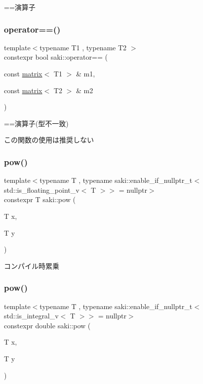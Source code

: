 ==演算子 

\mbox{\label{namespacesaki_a1ffbf8122dda5209dc384e64747bec32}} 
\subsubsection{\texorpdfstring{operator==()}{operator==()}\hspace{0.1cm}{\footnotesize\ttfamily [11/11]}}
{\footnotesize\ttfamily template$<$typename T1 , typename T2 $>$ \\
constexpr bool saki\+::operator== (\begin{DoxyParamCaption}\item[{const \mbox{\hyperlink{classsaki_1_1matrix}{matrix}}$<$ T1 $>$ \&}]{m1,  }\item[{const \mbox{\hyperlink{classsaki_1_1matrix}{matrix}}$<$ T2 $>$ \&}]{m2 }\end{DoxyParamCaption})}



==演算子(型不一致) 

この関数の使用は推奨しない \mbox{\label{namespacesaki_aa5b66f18d7c8c94b4c50731449ed3240}} 
\subsubsection{\texorpdfstring{pow()}{pow()}\hspace{0.1cm}{\footnotesize\ttfamily [1/3]}}
{\footnotesize\ttfamily template$<$typename T , typename saki\+::enable\+\_\+if\+\_\+nullptr\+\_\+t$<$ std\+::is\+\_\+floating\+\_\+point\+\_\+v$<$ T $>$$>$  = nullptr$>$ \\
constexpr T saki\+::pow (\begin{DoxyParamCaption}\item[{T}]{x,  }\item[{T}]{y }\end{DoxyParamCaption})}



コンパイル時累乗 

\mbox{\label{namespacesaki_a53b0e93733e85d7c6ab17aea25072536}} 
\subsubsection{\texorpdfstring{pow()}{pow()}\hspace{0.1cm}{\footnotesize\ttfamily [2/3]}}
{\footnotesize\ttfamily template$<$typename T , typename saki\+::enable\+\_\+if\+\_\+nullptr\+\_\+t$<$ std\+::is\+\_\+integral\+\_\+v$<$ T $>$$>$  = nullptr$>$ \\
constexpr double saki\+::pow (\begin{DoxyParamCaption}\item[{T}]{x,  }\item[{T}]{y }\end{DoxyParamCaption})}



